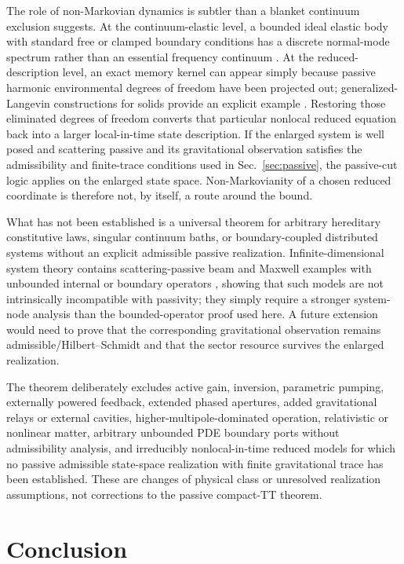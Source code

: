 The role of non-Markovian dynamics is subtler than a blanket continuum exclusion suggests. At the continuum-elastic level, a bounded ideal elastic body with standard free or clamped boundary conditions has a discrete normal-mode spectrum rather than an essential frequency continuum \cite{Capoferri2023}. At the reduced-description level, an exact memory kernel can appear simply because passive harmonic environmental degrees of freedom have been projected out; generalized-Langevin constructions for solids provide an explicit example \cite{Stella2014}. Restoring those eliminated degrees of freedom converts that particular nonlocal reduced equation back into a larger local-in-time state description. If the enlarged system is well posed and scattering passive and its gravitational observation satisfies the admissibility and finite-trace conditions used in Sec.~\ref{sec:passive}, the passive-cut logic applies on the enlarged state space. Non-Markovianity of a chosen reduced coordinate is therefore not, by itself, a route around the bound.

What has not been established is a universal theorem for arbitrary hereditary constitutive laws, singular continuum baths, or boundary-coupled distributed systems without an explicit admissible passive realization. Infinite-dimensional system theory contains scattering-passive beam and Maxwell examples with unbounded internal or boundary operators \cite{StaffansWeiss2012}, showing that such models are not intrinsically incompatible with passivity; they simply require a stronger system-node analysis than the bounded-operator proof used here. A future extension would need to prove that the corresponding gravitational observation remains admissible/Hilbert--Schmidt and that the sector resource survives the enlarged realization.

The theorem deliberately excludes active gain, inversion, parametric pumping, externally powered feedback, extended phased apertures, added gravitational relays or external cavities, higher-multipole-dominated operation, relativistic or nonlinear matter, arbitrary unbounded PDE boundary ports without admissibility analysis, and irreducibly nonlocal-in-time reduced models for which no passive admissible state-space realization with finite gravitational trace has been established. These are changes of physical class or unresolved realization assumptions, not corrections to the passive compact-TT theorem.

\section{Conclusion}

